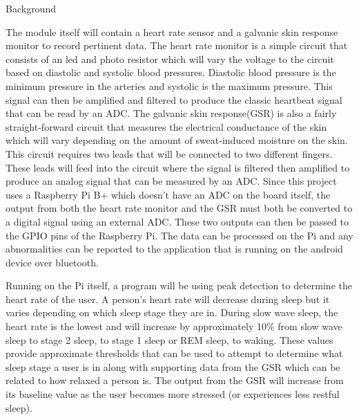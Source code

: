 \documentclass[finalProposal.tex]{subfiles}
\begin{document}
{\Large Background}

The module itself will contain a heart rate sensor and a galvanic skin response monitor to record pertinent data. The heart rate monitor is a simple circuit that consists of an led and photo resistor
which will vary the voltage to the circuit based on diastolic and systolic blood pressures. Diastolic blood pressure is the minimum pressure in the arteries and systolic is the maximum pressure. This
signal can then be amplified and filtered to produce the classic heartbeat signal that can be read by an ADC. The galvanic skin response(GSR) is also a fairly straight-forward circuit that measures
the electrical conductance of the skin which will vary depending on the amount of sweat-induced moisture on the skin. This circuit requires two leads that will be connected to two different fingers.
These leads will feed into the circuit where the signal is filtered then amplified to produce an analog signal that can be measured by an ADC. Since this project uses a Raspberry Pi B+ which doesn't have
an ADC on the board itself, the output from both the heart rate monitor and the GSR must both be converted to a digital signal using an external ADC. These two outputs can then be passed to the GPIO
pins of the Raspberry Pi. The data can be processed on the Pi and any abnormalities can be reported to the application that is running on the android device over bluetooth.  

Running on the Pi itself, a program will be using peak detection to determine the heart rate of the user. A person's heart rate will decrease during sleep but it varies depending on which sleep stage
they are in. During slow wave sleep, the heart rate is the lowest and will increase by approximately 10\% from slow wave sleep to stage 2 sleep, to stage 1 sleep or REM sleep, to waking. These values
provide approximate thresholds that can be used to attempt to determine what sleep stage a user is in along with supporting data from the GSR which can be related to how relaxed a person is. The output
from the GSR will increase from its baseline value as the user becomes more stressed (or experiences less restful sleep).
\end{document}
